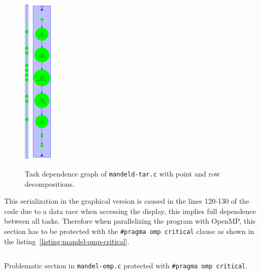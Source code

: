 \begin{figure}[H]
\centering
\includegraphics[height=8cm]{plots/dependency_graph_mandeld_point.png}
\hspace{5em}
\includegraphics[height=8cm]{plots/dependency_graph_mandeld_row.pdf}
\caption{Task dependence graph of \texttt{mandeld-tar.c} with point and row decompositions.}
\label{graph:mandeld_point_and_row}
\end{figure}

This serialization in the graphical version is caused in the lines 120-130 of the code due to a data race when accessing the display, this implies full dependence between all tasks. Therefore when parallelizing the program with OpenMP, this section has to be protected with the \texttt{\#pragma omp critical} clause as shown in the listing~\ref{listing:mandel-omp-critical}.

\begin{listing}[H]
\inputminted[firstline=120,lastline=130]{c}{sources/mandel-omp-v1.c}
\caption{Problematic section in \texttt{mandel-omp.c} protected with \texttt{\#pragma omp critical}.}
\label{listing:mandel-omp-critical}
\end{listing}

